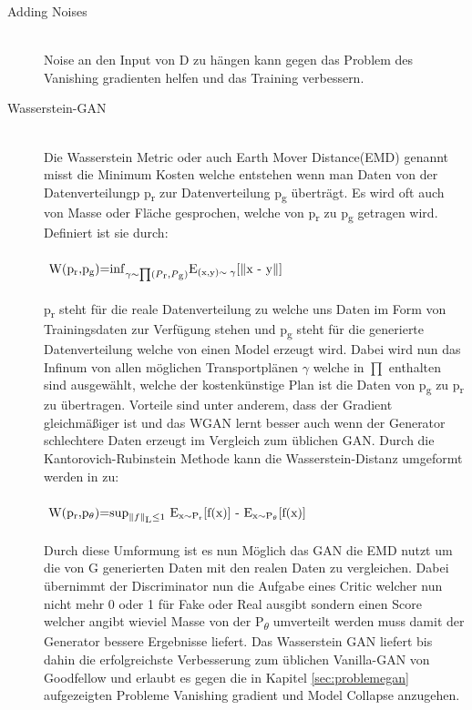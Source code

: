 \documentclass{llncs}
\begin{document}
\begin{description}
\item[Adding Noises]
~\\
Noise an den Input von D zu hängen kann gegen das Problem des Vanishing gradienten helfen und das Training verbessern\cite{improvingan}.\\

\item[Wasserstein-GAN]
~\\
Die Wasserstein Metric oder auch Earth Mover Distance(EMD) genannt misst die Minimum Kosten welche entstehen wenn man Daten von der Datenverteilungp p\textsubscript{r} zur Datenverteilung p\textsubscript{g} überträgt. Es wird oft auch von Masse oder Fläche gesprochen, welche von p\textsubscript{r} zu p\textsubscript{g} getragen wird. Definiert ist sie durch:
\\\\
\begin{math} 
$
W(p\textsubscript{r},p\textsubscript{g})=$\inf_{\gamma\sim\prod(P\textsubscript{r},P\textsubscript{g})}$E\textsubscript{(x,y)$\sim\gamma$}[$\parallel$x - y$\parallel$]
$
\end{math}
\\\\
p\textsubscript{r} steht für die reale Datenverteilung zu welche uns Daten im Form von Trainingsdaten zur Verfügung stehen und p\textsubscript{g} steht für die generierte Datenverteilung welche von einen Model erzeugt wird. Dabei wird nun das Infinum von allen möglichen Transportplänen $\gamma$ welche in $\prod$ enthalten sind ausgewählt, welche der kostenkünstige Plan ist die Daten von p\textsubscript{g} zu p\textsubscript{r} zu übertragen. Vorteile sind unter anderem, dass der Gradient gleichmäßiger ist und das WGAN lernt besser auch wenn der Generator schlechtere Daten erzeugt im Vergleich zum üblichen GAN\cite{wasserstein}. Durch die Kantorovich-Rubinstein Methode kann die Wasserstein-Distanz umgeformt werden in zu:
\\\\
\begin{math} 
$
W(p\textsubscript{r},p\textsubscript{$\theta$})=$\sup_{\parallel f \parallel \textsubscript{L}\leq 1}$ E\textsubscript{x$\sim$P\textsubscript{r}}[f(x)] - E\textsubscript{x$\sim$P\textsubscript{$\theta$}}[f(x)]
$
\end{math}
\\\\
Durch diese Umformung ist es nun Möglich das GAN die EMD nutzt um die von G generierten Daten mit den realen Daten zu vergleichen. Dabei übernimmt der Discriminator nun die Aufgabe eines Critic welcher nun nicht mehr 0 oder 1 für Fake oder Real ausgibt sondern einen Score welcher angibt wieviel Masse von der P\textsubscript{$\theta$} umverteilt werden muss damit der Generator bessere Ergebnisse liefert. Das Wasserstein GAN liefert bis dahin die erfolgreichste Verbesserung zum üblichen Vanilla-GAN von Goodfellow und erlaubt es gegen die in Kapitel \ref{sec:problemegan} aufgezeigten Probleme Vanishing gradient und Model Collapse anzugehen\cite{wasserstein}. 
\end{description}
\end{document}
